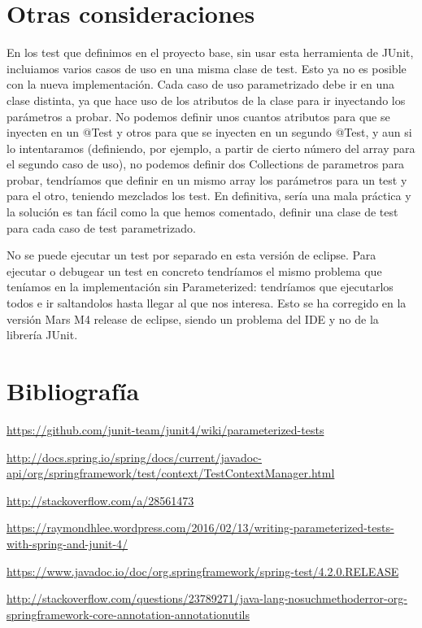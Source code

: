 \documentclass[a4paper]{article}
\begin{document}
\section{Otras consideraciones}

En los test que definimos en el proyecto base, sin usar esta herramienta de JUnit, incluiamos varios casos de uso en una misma clase de test. Esto ya no es posible con la nueva implementación. Cada caso de uso parametrizado debe ir en una clase distinta, ya que hace uso de los atributos de la clase para ir inyectando los parámetros a probar. No podemos definir unos cuantos atributos para que se inyecten en un @Test y otros para que se inyecten en un segundo @Test, y aun si lo intentaramos (definiendo, por ejemplo, a partir de cierto número del array para el segundo caso de uso), no podemos definir dos Collections de parametros para probar, tendríamos que definir en un mismo array los parámetros para un test y para el otro, teniendo mezclados los test. En definitiva, sería una mala práctica y la solución es tan fácil como la que hemos comentado, definir una clase de test para cada caso de test parametrizado.

No se puede ejecutar un test por separado en esta versión de eclipse. Para ejecutar o debugear un test en concreto tendríamos el mismo problema que teníamos en la implementación sin Parameterized: tendríamos que ejecutarlos todos e ir saltandolos hasta llegar al que nos interesa. Esto se ha corregido en la versión Mars M4 release de eclipse, siendo un problema del IDE y no de la librería JUnit.

\section{Bibliografía}
\url{https://github.com/junit-team/junit4/wiki/parameterized-tests}

\url{http://docs.spring.io/spring/docs/current/javadoc-api/org/springframework/test/context/TestContextManager.html}

\url{http://stackoverflow.com/a/28561473}

\url{https://raymondhlee.wordpress.com/2016/02/13/writing-parameterized-tests-with-spring-and-junit-4/}

\url{https://www.javadoc.io/doc/org.springframework/spring-test/4.2.0.RELEASE}

\url{http://stackoverflow.com/questions/23789271/java-lang-nosuchmethoderror-org-springframework-core-annotation-annotationutils}
\end{document}
